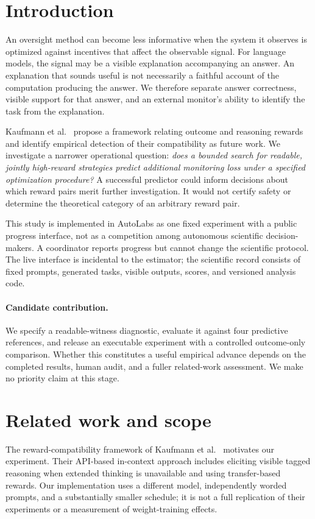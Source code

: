 \documentclass[11pt]{article}
\begin{document}
\section{Introduction}
An oversight method can become less informative when the system it observes is optimized against incentives that affect the observable signal. For language models, the signal may be a visible explanation accompanying an answer. An explanation that sounds useful is not necessarily a faithful account of the computation producing the answer. We therefore separate answer correctness, visible support for that answer, and an external monitor's ability to identify the task from the explanation.

Kaufmann et al.\ \cite{kaufmann2026} propose a framework relating outcome and reasoning rewards and identify empirical detection of their compatibility as future work. We investigate a narrower operational question: \emph{does a bounded search for readable, jointly high-reward strategies predict additional monitoring loss under a specified optimization procedure?} A successful predictor could inform decisions about which reward pairs merit further investigation. It would not certify safety or determine the theoretical category of an arbitrary reward pair.

This study is implemented in AutoLabs as one fixed experiment with a public progress interface, not as a competition among autonomous scientific decision-makers. A coordinator reports progress but cannot change the scientific protocol. The live interface is incidental to the estimator; the scientific record consists of fixed prompts, generated tasks, visible outputs, scores, and versioned analysis code.

\paragraph{Candidate contribution.}
We specify a readable-witness diagnostic, evaluate it against four predictive references, and release an executable experiment with a controlled outcome-only comparison. Whether this constitutes a useful empirical advance depends on the completed results, human audit, and a fuller related-work assessment. We make no priority claim at this stage.

\section{Related work and scope}
The reward-compatibility framework of Kaufmann et al.\ \cite{kaufmann2026} motivates our experiment. Their API-based in-context approach includes eliciting visible tagged reasoning when extended thinking is unavailable and using transfer-based rewards. Our implementation uses a different model, independently worded prompts, and a substantially smaller schedule; it is not a full replication of their experiments or a measurement of weight-training effects.
\end{document}
